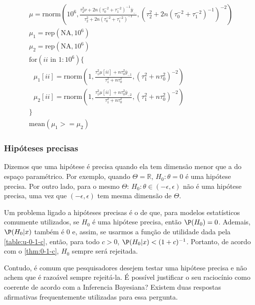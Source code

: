 { \begin{align}
  \label{code:simula-anova}
  &\mu = \text{rnorm}\left(10^6, \frac{\tau_{2}^{2}\nu+ 2n(\tau_{0}^{-2}+\tau_{1}^{-2})^{-1}\bar{y}_{.,.}}{\tau_{2}^{2}+2n(\tau_{0}^{-2}+\tau_{1}^{-2})^{-1}}, (\tau_{2}^{2}+2n(\tau_{0}^{-2}+\tau_{1}^{-2})^{-1})^{-2}\right) \nonumber \\
  &\mu_{1} = \text{rep}(\text{NA}, 10^6) \nonumber\\
  &\mu_{2} = \text{rep}(\text{NA}, 10^6) \nonumber\\
  &\text{for}(ii \text{ in } 1:10^{6}) \{ \nonumber\\
  &\text{  }\mu_{1}[ii] = \text{rnorm}\left(1, \frac{\tau_{1}^{2}\mu[ii]+n\tau_{0}^{2}\bar{y}_{.,1}}{\tau_{1}^{2}+n\tau_{0}^{2}}, (\tau_{1}^{2}+n\tau_{0}^{2})^{-2}\right) \nonumber\\
  &\text{  }\mu_{2}[ii] = \text{rnorm}\left(1, \frac{\tau_{1}^{2}\mu[ii]+n\tau_{0}^{2}\bar{y}_{.,2}}{\tau_{1}^{2}+n\tau_{0}^{2}}, (\tau_{1}^{2}+n\tau_{0}^{2})^{-2}\right) \nonumber\\
  &\} \nonumber \\
  &\text{mean}(\mu_{1} >= \mu_{2})
 \end{align}
}{}

\subsubsection{Hipóteses precisas}

Dizemos que uma hipótese é precisa quando 
ela tem dimensão menor que a do espaço paramétrico.
Por exemplo, quando $\Theta = \mathbb{R}$,
$H_{0}: \theta = 0$ é uma hipótese precisa.
Por outro lado, para o mesmo 
$\Theta$: $H_{0}: \theta \in (-\epsilon,\epsilon)$
não é uma hipótese precisa, uma vez que
$(-\epsilon,\epsilon)$ tem mesma dimensão de $\Theta$.

Um problema ligado a hipóteses precisas é o de que,
para modelos estatísticos comumente utilizados, 
se $H_{0}$ é uma hipótese precisa,
então $\P(H_{0}) = 0$.
Ademais, $\P(H_{0}|x)$ também é $0$ e, assim,
se usarmos a função de utilidade 
dada pela \cref{table:u-0-1-c},
então, para todo $c>0$, 
$\P(H_{0}|x) < (1+c)^{-1}$.
Portanto, de acordo com o \cref{thm:0-1-c},
$H_{0}$ sempre será rejeitada.

Contudo, é comum que pesquisadores
desejem testar uma hipótese precisa e
não achem que é razoável sempre rejeitá-la.
É possível justificar o seu raciocínio como coerente
de acordo com a Inferencia Bayesiana?
Existem duas respostas afirmativas frequentemente 
utilizadas para essa pergunta.

